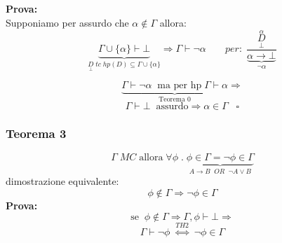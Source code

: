 \documentclass{article}
\theoremstyle{break}
\theoremstyle{break}
\theoremstyle{break}
\theoremstyle{break}
\begin{document}
\textbf{Prova:}\\
Supponiamo per assurdo che \( \alpha \notin \Gamma \) allora:
\[ \underbrace{\Gamma \cup \{\alpha\} \vdash \bot}_{\underset{\bot}{D}\;tc\; hp(D) \subseteq \Gamma \cup \{\alpha\} } \Rightarrow \Gamma \vdash \neg \alpha \;\;\;\;\;\;\;per:\; \frac{\underset{\bot}{\stackrel{\alpha}{D}}}{\underbrace{\alpha \to \bot}_{\neg \alpha}} \] 

\[
  \underbrace{\Gamma \vdash \neg \alpha \;\; \text{ma per hp}\; \Gamma \vdash \alpha}_{\text{Teorema 0}} \Rightarrow
\] 
\[
\Gamma \vdash \bot \;\; \text{assurdo} \Rightarrow \alpha \in \Gamma \;\;\; \square
\] 
\subsubsection{Teorema 3}
\[
  \Gamma\;MC\; \text{allora}\; \forall \phi\;.\; \underbrace{\phi \in \Gamma = \neg \phi \in \Gamma}_{A \to B\;\;OR\;\; \neg A \vee B}
\]  
dimostrazione equivalente:
\[
\phi \notin \Gamma \Rightarrow \neg \phi \in \Gamma
\] 
\textbf{Prova:}
\[
\text{se}\;\; \phi \notin \Gamma \Rightarrow \Gamma, \phi \vdash \bot \Rightarrow
\] 
\[
  \Gamma \vdash \neg \phi\; \stackrel{TH2}{\Leftrightarrow}\; \neg \phi \in \Gamma
\] 
\end{document}
